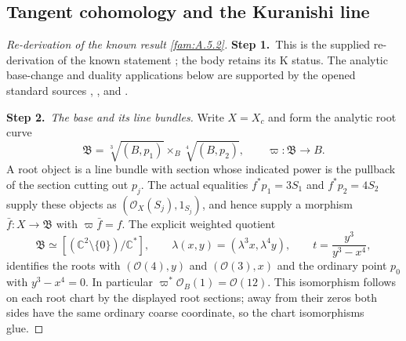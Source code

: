 \subsection{Tangent cohomology and the Kuranishi line}\label{app:tangent-rederivation}
\begin{proof}[Re-derivation of the known result \ref{fam:A.5.2}]
\par\smallskip\noindent\textbf{Step 1.}\ This is the supplied re-derivation of the known statement
\cite[Theorems 1.3 and 6.12]{DGKXv1}; the body retains its K status.
The analytic base-change and duality applications below are supported by
the opened standard sources \cite[III.4.10, III.4.12]{BS76},
\cite[pp.~261, 264--266]{RRV71}, and \cite[p.~91, Proposition 2]{RR70}.

\par\smallskip\noindent\textbf{Step 2.}\ \emph{The base and its line bundles.}
Write $X=X_c$ and form the analytic root curve
\[
 \mathfrak B=\sqrt[3]{(B,p_1)}\mathbin{\times_B}\sqrt[4]{(B,p_2)},
 \qquad \varpi:\mathfrak B\longrightarrow B.
\]
A root object is a line bundle with section whose indicated power is the
pullback of the section cutting out $p_j$. The actual equalities
$f^*p_1=3S_1$ and $f^*p_2=4S_2$ supply these objects as
$(\mathcal O_X(S_j),1_{S_j})$, and hence supply a morphism
$\bar f:X\to\mathfrak B$ with $\varpi\bar f=f$.
The explicit weighted quotient
\[
 \mathfrak B\simeq[(\mathbb C^2\setminus\{0\})/\mathbb C^*],
 \qquad \lambda(x,y)=(\lambda^3x,\lambda^4y),
 \qquad t=\frac{y^3}{y^3-x^4},
\]
identifies the roots with $(\mathcal O(4),y)$ and
$(\mathcal O(3),x)$ and the ordinary point $p_0$ with
$y^3-x^4=0$. In particular $\varpi^*\mathcal O_B(1)=\mathcal O(12)$.
This isomorphism follows on each root chart by the displayed root
sections; away from their zeros both sides have the same ordinary coarse
coordinate, so the chart isomorphisms glue.


\end{proof}
